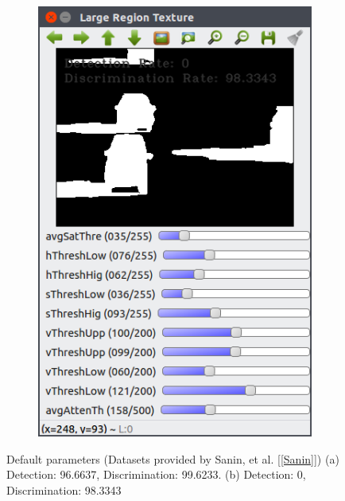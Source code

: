\documentclass[12pt]{report}
\begin{document}
\begin{figure}
\begin{subfigure}{.49\linewidth}
    \includegraphics[width=1\linewidth]{figures/background/lr_highway1_default.png}
    \caption{}
  \end{subfigure}
  \caption{Default parameters (Datasets provided by Sanin, et al. [\ref{Sanin}]) (a) Detection: 96.6637, Discrimination: 99.6233. (b) Detection: 0, Discrimination: 98.3343}
  \label{fig:vthreshdefault}
\end{figure}
\end{document}

